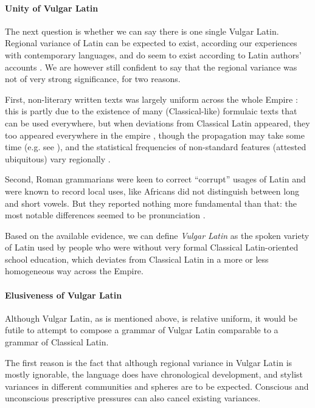 \documentclass[a4paper, oneside, 12pt]{report}
\newcommand*{\citepage}[1]{p.~{#1}}
\newcommand*{\term}[1]{\emph{#1}}
\begin{document}
\paragraph*{Unity of Vulgar Latin}
The next question is whether we can say there is one single Vulgar Latin.
Regional variance of Latin can be expected to exist,
according our experiences with contemporary languages,
and do seem to exist according to Latin authors' accounts
\citep[\citepage{116}]{herman2010vulgar}.
We are however still confident to say that the regional variance 
was not of very strong significance, for two reasons.

First, non-literary written texts was largely uniform across the whole Empire
\citep[\citepage{117}]{herman2010vulgar}:
this is partly due to the existence of 
many (Classical-like) formulaic texts that can be used everywhere,
but when deviations from Classical Latin appeared,
they too appeared everywhere in the empire
\citep[\citepage{235}]{clackson2011blackwell},
though the propagation may take some time
(e.g. see ),
and the statistical frequencies of non-standard features (attested ubiquitous) vary regionally
\citep[\citepage{118}]{herman2010vulgar}.

Second, Roman grammarians were keen to correct ``corrupt'' usages of Latin 
and were known to record local uses, 
like Africans did not distinguish between long and short vowels.
But they reported nothing more fundamental than that:
the most notable differences seemed to be pronunciation
\citep[\citepage{118}]{herman2010vulgar}.

Based on the available evidence,
we can define \term{Vulgar Latin} as the spoken variety of Latin
used by people who were without very formal Classical Latin-oriented school education,
which deviates from Classical Latin in a more or less homogeneous way across the Empire.

\paragraph*{Elusiveness of Vulgar Latin}\label{sec:introduction.history.sub-elite.elusive}
Although Vulgar Latin, as is mentioned above, is relative uniform,
it would be futile to attempt to compose a grammar of Vulgar Latin comparable
to a grammar of Classical Latin.

The first reason is the fact that
although regional variance in Vulgar Latin is mostly ignorable,
the language does have chronological development, 
and stylist variances in different communities and spheres are to be expected.
Conscious and unconscious prescriptive pressures can also cancel existing variances. 
\end{document}
